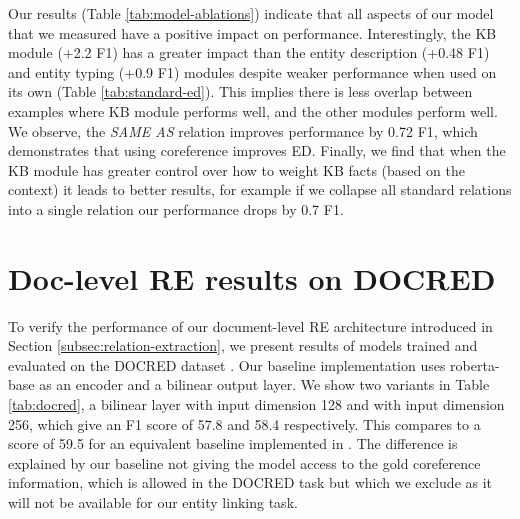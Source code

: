 \documentclass[11pt]{article}
\begin{document}
Our results (Table \ref{tab:model-ablations}) indicate that all aspects of our model that we measured have a positive impact on performance. Interestingly, the KB module (+2.2 F1) has a greater impact than the entity description (+0.48 F1) and entity typing (+0.9 F1) modules despite weaker performance when used on its own (Table \ref{tab:standard-ed}). This implies there is less overlap between examples where KB module performs well, and the other modules perform well. We observe, the \emph{SAME AS} relation improves performance by 0.72 F1, which demonstrates that using coreference improves ED. Finally, we find that when the KB module has greater control over how to weight KB facts (based on the context) it leads to better results, for example if we collapse all standard relations into a single relation our performance drops by 0.7 F1.


\section{Doc-level RE results on DOCRED}
\label{sec:doc_level_re}

To verify the performance of our document-level RE architecture introduced in Section \ref{subsec:relation-extraction}, we present results of models trained and evaluated on the DOCRED dataset \cite{docred}. Our baseline implementation uses roberta-base as an encoder and a bilinear output layer. We show two variants in Table \ref{tab:docred}, a bilinear layer with input dimension 128 and with input dimension 256, which give an F1 score of 57.8 and 58.4 respectively. This compares to a score of 59.5 for an equivalent baseline implemented in \cite{ssan}. The difference is explained by our baseline not giving the model access to the gold coreference information, which is allowed in the DOCRED task but which we exclude as it will not be available for our entity linking task. 

\begin{table}[h]
\centering
{}
\caption{Document-level relation extraction F1 scores on the DOCRED dev dataset.}
\label{tab:docred}
\end{table}
\end{document}
